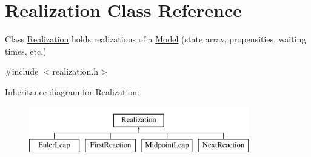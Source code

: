 \hypertarget{class_realization}{}\section{Realization Class Reference}
\label{class_realization}


Class \hyperlink{class_realization}{Realization} holds realizations of a \hyperlink{class_model}{Model} (state array, propensities, waiting times, etc.)  




{\ttfamily \#include $<$realization.\+h$>$}

Inheritance diagram for Realization\+:\begin{figure}[H]
\begin{center}
\leavevmode
\includegraphics[height=2.000000cm]{class_realization}
\end{center}
\end{figure}
